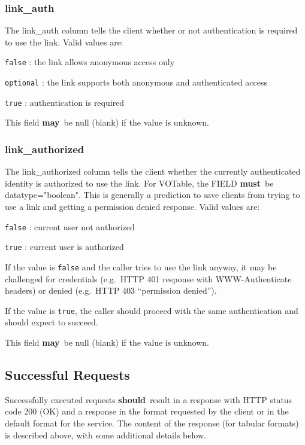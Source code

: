\documentclass[11pt,a4paper]{ivoa}
\newcommand{\attval}[2]{#1={\allowbreak}{"}#2{"}}
\newcommand{\rfcmust}{\textbf{must}}
\newcommand{\rfcshould}{\textbf{should}}
\newcommand{\rfcmay}{\textbf{may}}
\begin{document}
\subsubsection{link\_auth}

The link\_auth column tells the client whether or not authentication is required 
to use the link. Valid values are:

\verb|false| : the link allows anonymous access only

\verb|optional| : the link supports both anonymous and authenticated access

\verb|true| : authentication is required

This field \rfcmay\ be null (blank) if the value is unknown.

\subsubsection{link\_authorized}

The link\_authorized column tells the client whether the currently authenticated 
identity is authorized to use the link. For VOTable, the FIELD \rfcmust\ be
\attval{datatype}{boolean}. This is generally a prediction to save 
clients from trying to use a link and getting a permission denied response. Valid 
values are:

\verb|false| : current user not authorized

\verb|true| : current user is authorized

If the value is \verb|false| and the caller tries to use the link anyway, it may be 
challenged for credentials (e.g.\ HTTP 401 response with WWW-Authenticate headers) or 
denied (e.g.\ HTTP 403 ``permission denied'').

If the value is \verb|true|, the caller should proceed with the same authentication
and should expect to succeed.

This field \rfcmay\ be null (blank) if the value is unknown.

\subsection{Successful Requests}
\label{sec:successfulRequests}

Successfully executed requests \rfcshould\ result in a response with HTTP
status code 200 (OK) and a response in the format requested by the client
or in the default format for the service. The content of the response
(for tabular formats) is described above,
with some additional details below.
\end{document}
